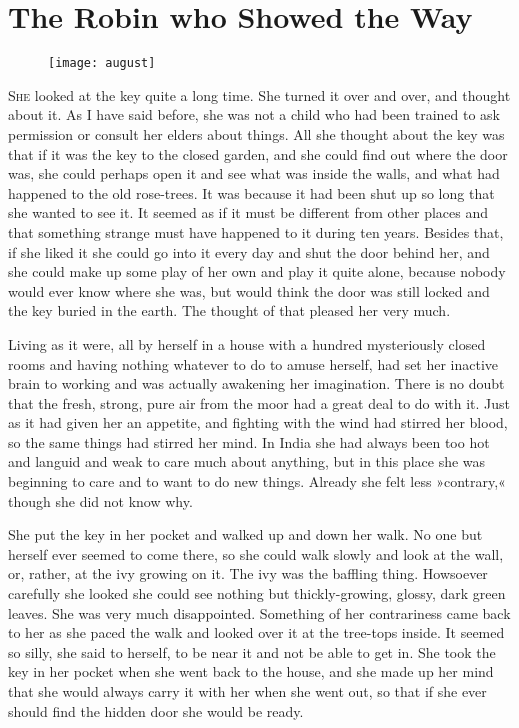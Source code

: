 \chapter{The Robin who Showed the Way} 
	
\begin{figure}[t!]
\centering
\texttt{[image: august]}
\end{figure}

 \lettrine[lines=6]{S}{he} looked at the key quite a long time. She turned it over and over, and thought about it. As I have said before, she was not a child who had been trained to ask permission or consult her elders about things. All she thought about the key was that if it was the key to the closed garden, and she could find out where the door was, she could perhaps open it and see what was inside the walls, and what had happened to the old rose-trees. It was because it had been shut up so long that she wanted to see it. It seemed as if it must be different from other places and that something strange must have happened to it during ten years. Besides that, if she liked it she could go into it every day and shut the door behind her, and she could make up some play of her own and play it quite alone, because nobody would ever know where she was, but would think the door was still locked and the key buried in the earth. The thought of that pleased her very much.

Living as it were, all by herself in a house with a hundred mysteriously closed rooms and having nothing whatever to do to amuse herself, had set her inactive brain to working and was actually awakening her imagination. There is no doubt that the fresh, strong, pure air from the moor had a great deal to do with it. Just as it had given her an appetite, and fighting with the wind had stirred her blood, so the same things had stirred her mind. In India she had always been too hot and languid and weak to care much about anything, but in this place she was beginning to care and to want to do new things. Already she felt less »contrary,« though she did not know why.

She put the key in her pocket and walked up and down her walk. No one but herself ever seemed to come there, so she could walk slowly and look at the wall, or, rather, at the ivy growing on it. The ivy was the baffling thing. Howsoever carefully she looked she could see nothing but thickly-growing, glossy, dark green leaves. She was very much disappointed. Something of her contrariness came back to her as she paced the walk and looked over it at the tree-tops inside. It seemed so silly, she said to herself, to be near it and not be able to get in. She took the key in her pocket when she went back to the house, and she made up her mind that she would always carry it with her when she went out, so that if she ever should find the hidden door she would be ready.

